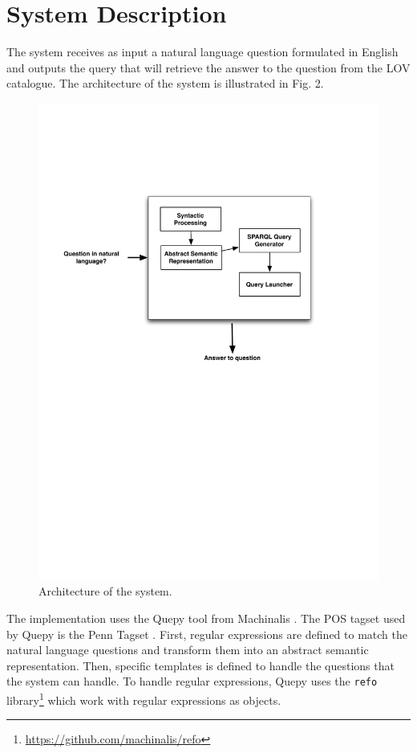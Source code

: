 \documentclass[runningheads,a4paper]{llncs}
\begin{document}
\section{System Description}
\label{sec:system}

The system receives as input a natural language question formulated in English
and outputs the query that will retrieve the answer to the question from the
LOV catalogue. The architecture of the system is illustrated in Fig. 2.

\begin{figure}[ht!b]
\centering
\caption{Architecture of the system.}
\includegraphics[scale=.6]{qa4lov-archi.pdf}

\label{fig:q4lovarchi}
\end{figure}

The implementation uses the Quepy tool from Machinalis \cite{quepy2012}. The POS tagset used by Quepy is the Penn Tagset \cite{marcus1993building}. First, regular expressions are defined to match the natural language questions and transform them into an abstract semantic representation. Then, specific templates is defined to handle the questions that the system can handle. To handle regular expressions, Quepy uses the \texttt{refo} library\footnote{\url{https://github.com/machinalis/refo}} which work with regular expressions as objects. 
\end{document}
